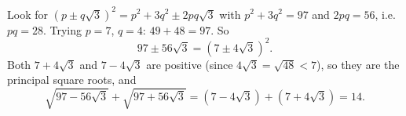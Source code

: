Look for $(p\pm q\sqrt3)^2=p^2+3q^2\pm2pq\sqrt3$ with $p^2+3q^2=97$ and $2pq=56$, i.e. $pq=28$. Trying $p=7$, $q=4$: $49+48=97$. So
\[97\pm56\sqrt3=\left(7\pm4\sqrt3\right)^2.\]
Both $7+4\sqrt3$ and $7-4\sqrt3$ are positive (since $4\sqrt3=\sqrt{48}<7$), so they are the principal square roots, and
\[\sqrt{97-56\sqrt3}+\sqrt{97+56\sqrt3}=\left(7-4\sqrt3\right)+\left(7+4\sqrt3\right)=\boxed{14}.\]
